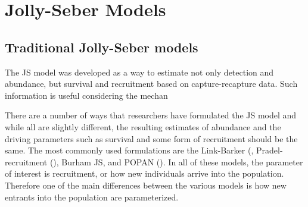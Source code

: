 \section{Jolly-Seber Models}

\subsection{Traditional Jolly-Seber models}

The JS model was developed as a way to estimate not only
detection and abundance, but survival and recruitment based on 
capture-recapture data.   Such information is useful considering
the mechan


There are a number of ways that researchers have
formulated the JS model and while
all are slightly different, 
the resulting estimates of abundance and the driving parameters such
as survival and some form of recruitment should be the same.  
The most commonly used formulations are the
Link-Barker (\citep{link_barker:2005}, Pradel-recruitment (\citep{pradel:1996}), Burham JS, 
and POPAN (\citep{schwarz_arnason:1996}).
In all of these models, the parameter of interest
is recruitment, or how new individuals arrive into the population.
Therefore one of the main differences between
the various models is how new entrants into the population are parameterized.


